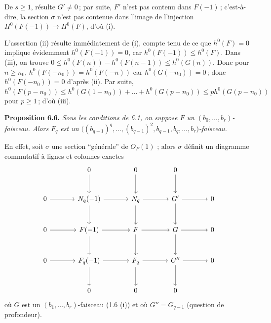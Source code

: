 
De $s\ge1$, r\'esulte $G'\ne0$\,; par suite, $F'$ n'est pas contenu dans $F(-1)$\,; c'est-\`a-dire, la section $\sigma$ n'est pas contenue dans l'image de l'injection $H^0(F(-1))\to H^0(F)$, d'o\`u (i).

L'assertion (ii) r\'esulte imm\'ediatement de (i), compte tenu de ce que $h^0(F)=0$ implique \'evidemment $h^0(F(-1))=0$, car $h^0(F(-1))\le h^0(F)$. Dans (iii), on trouve $0\le h^0(F(n))-h^0(F(n-1))\le h^0(G(n))$. Donc pour $n\ge n_0$, $h^0(F(-n_0))=h^0(F(-n))$ car $h^0(G(-n_0))=0$\,; donc $h^0(F(-n_0))=0$ d'apr\`es (ii). Par suite, $h^0(F(p-n_0))\le h^0(G(1-n_0))+\ldots+h^0(G(p-n_0))\le ph^0(G(p-n_0))$ pour $p\ge1$\,; d'o\`u (iii).

\textbf{Proposition 6.6.} \emph{Sous les conditions de 6.1, on suppose $F$ un $(b_0,\ldots,b_r)$-faisceau. Alors $F_q$ est un $\bigl((b_{q-1})^q,\ldots,(b_{q-1})^2,b_{q-1},b_q,\ldots,b_r\bigr)$-faisceau.}

En effet, soit $\sigma$ une section ``g\'en\'erale'' de ${O}_P(1)$ ; alors $\sigma$ d\'efinit un diagramme commutatif \`a lignes et colonnes exactes
\[
\begin{tikzcd}[column sep=large,row sep=large]
&0 \arrow[d]&0 \arrow[d]&0 \arrow[d]&\\
0 \arrow[r]&N_q(-1) \arrow[r] \arrow[d]&N_q \arrow[r] \arrow[d]&G' \arrow[r] \arrow[d]&0\\
0 \arrow[r]&F(-1) \arrow[r] \arrow[d]&F \arrow[r] \arrow[d]&G \arrow[r] \arrow[d]&0\\
0 \arrow[r]&F_q(-1) \arrow[r] \arrow[d]&F_q \arrow[r] \arrow[d]&G'' \arrow[r] \arrow[d]&0\\
&0&0&0&
\end{tikzcd}
\]
o\`u $G$ est un $(b_1,\ldots,b_r)$-faisceau (1.6 (i)) et o\`u $G''=G_{q-1}$ (question de profondeur).
